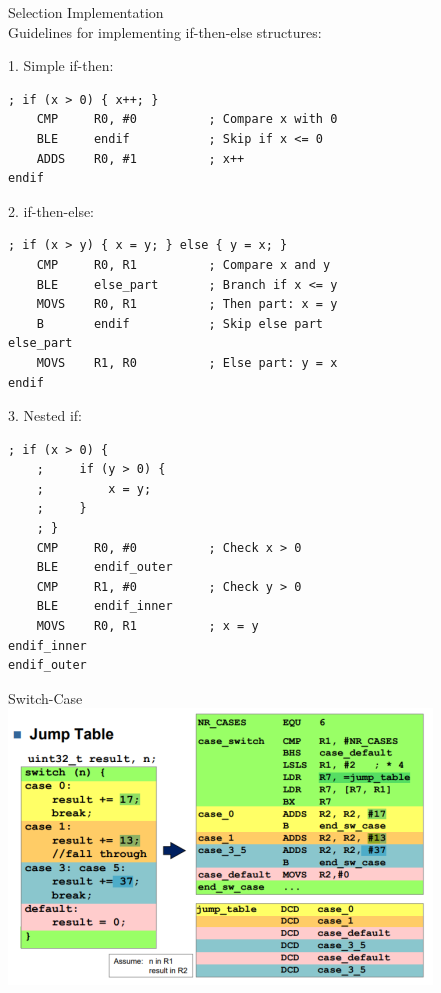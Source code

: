 \begin{KR}{Selection Implementation}\\
Guidelines for implementing if-then-else structures:

1. Simple if-then:
\begin{lstlisting}[language=armasm, style=basesmol]
    ; if (x > 0) { x++; }
    CMP     R0, #0          ; Compare x with 0
    BLE     endif           ; Skip if x <= 0
    ADDS    R0, #1          ; x++
endif
\end{lstlisting}

2. if-then-else:
\begin{lstlisting}[language=armasm, style=basesmol]
    ; if (x > y) { x = y; } else { y = x; }
    CMP     R0, R1          ; Compare x and y
    BLE     else_part       ; Branch if x <= y
    MOVS    R0, R1          ; Then part: x = y
    B       endif           ; Skip else part
else_part
    MOVS    R1, R0          ; Else part: y = x
endif
\end{lstlisting}

3. Nested if:
\begin{lstlisting}[language=armasm, style=basesmol]
    ; if (x > 0) {
    ;     if (y > 0) {
    ;         x = y;
    ;     }
    ; }
    CMP     R0, #0          ; Check x > 0
    BLE     endif_outer
    CMP     R1, #0          ; Check y > 0
    BLE     endif_inner
    MOVS    R0, R1          ; x = y
endif_inner
endif_outer
\end{lstlisting}
\end{KR}

\begin{definition}{Switch-Case}\\
    \includegraphics[width=\linewidth]{images/switch.png}
\end{definition}

